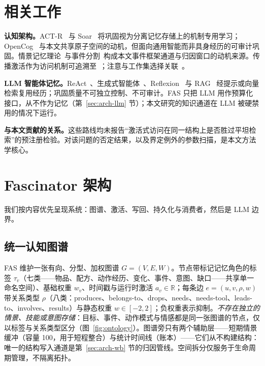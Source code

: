 \documentclass[10pt,a4paper]{ctexart}
\begin{document}
\section{相关工作}
\label{sec:related}

\textbf{认知架构。}ACT-R~\citep{anderson2004integrated} 与 Soar~\citep{laird2012soar} 将巩固视为分离记忆存储上的机制专用学习；OpenCog~\citep{hart2008opencog} 与本文共享原子空间的动机，但面向通用智能而非具身经历的可审计巩固。情景记忆理论~\citep{tulving1983elements,baddeley2000episodic}与事件分割~\citep{zacks2007event,schacter2007remembering}构成本文事件框架通道与归因窗口的动机来源。传播激活作为访问机制可追溯至~\citet{collins1975spreading}；注意与工作集选择关联~\citet{itti2001computational,posner1980orienting,cowan2001magical}。

\textbf{LLM 智能体记忆。}ReAct~\citep{yao2023react}、生成式智能体~\citep{park2023generative}、Reflexion~\citep{shinn2023reflexion} 与 RAG~\citep{lewis2020rag} 经提示或向量检索复用经历；巩固质量不可独立控制、不可审计。FAS 只把 LLM 用作预算化接口，从不作为记忆（第~\ref{sec:arch-llm} 节）；本文研究的知识通道在 LLM 被硬禁用的情况下运行。

\textbf{与本文贡献的关系。}这些路线均未报告“激活式访问在同一结构上是否胜过平坦检索”的预注册检验。对该问题的否定结果，以及界定例外的参数扫描，是本文方法学核心。

\section{Fascinator 架构}
\label{sec:arch}

我们按内容优先呈现系统：图谱、激活、写回、持久化与消费者，然后是 LLM 边界。

\subsection{统一认知图谱}
\label{sec:arch-graph}
FAS 维护一张有向、分型、加权图谱 $G=(V,E,W)$。节点带标记记忆角色的标签 $\tau_v$（七类——物品、配方、动作经历、变化、事件、意图、缺口——共享单一命名空间）、基础权重 $w_v$、时间戳与运行时激活 $a_v\in\mathbb{R}$；每条边 $e=(u,v,\rho,w)$ 带关系类型 $\rho$（八类：produces、belongs-to、drops、needs、needs-tool、leads-to、involves、results）与静态权重 $w\in[-2,2]$；负权重表示抑制。\emph{不存在独立的情景、技能或意图存储}：目标、事件、动作模式与情感都是同一张图谱的节点，仅以标签与关系类型区分（图~\ref{fig:ontology}）。图谱旁只有两个辅助层——短期情景缓冲（容量 100，用于短程整合）与统计时间线（账本）——它们从不构建结构：唯一的结构写入通道是第~\ref{sec:arch-wb} 节的归因管线。空间拆分仅服务于生命周期管理，不隔离拓扑。
\end{document}
